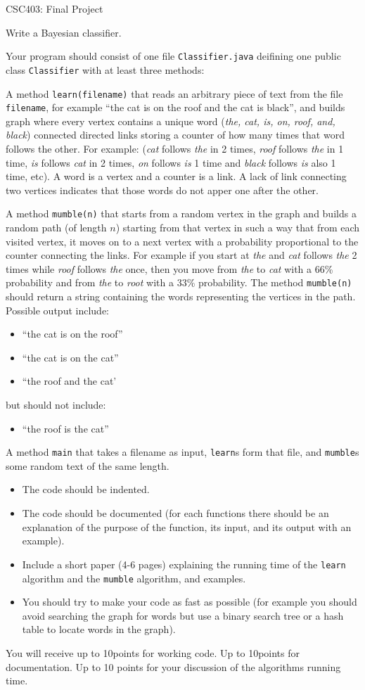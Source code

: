 \documentclass[12pt]{article}
\begin{document}
{\LARGE CSC403: Final Project}

\vskip 1cm

Write a Bayesian classifier. 

Your program should consist of one file {\tt Classifier.java} deifining one public class {\tt Classifier} with at least three methods:

A method {\tt learn(filename)} that reads an arbitrary piece of text from the file {\tt filename}, for example ``the cat is on the roof and the cat is black'', and builds graph where every vertex contains a unique word ({\it the, cat, is, on, roof, and, black}) connected directed links storing a counter of how many times that word follows the other. For example: ({\it cat} follows {\it the} in 2 times, {\it roof} follows {\it the} in 1 time, {\it is} follows {\it cat} in 2 times, {\it on} follows {\it is} 1 time and {\it black} follows {\it is} also 1 time, etc). A word is a vertex and a counter is a link. A lack of link connecting two vertices indicates that those words do not apper one after the other.

A method {\tt mumble(n)} that starts from a random vertex in the graph and builds a random path (of length $n$) starting from that vertex in such a way that from each visited vertex, it moves on to a next vertex with a probability proportional to the counter connecting the links. For example if you start at {\it the} and {\it cat} follows {\it the} 2 times while {\it roof} follows {\it the} once, then you move from {\it the} to {\it cat} with a 66\% probability and from {\it the} to {\it root} with a 33\% probability. The method {\tt mumble(n)} should return a string containing the words representing the vertices in the path. Possible output include:
\begin{itemize}
\item ``the cat is on the roof''
\item ``the cat is on the cat''
\item ``the roof and the cat'
\end{itemize}
but should not include:
\begin{itemize}
\item ``the roof is the cat''
\end{itemize}

A method {\tt main} that takes a filename as input, {\tt learn}s form that file, and {\tt mumble}s some random text of the same length.

\begin{itemize}
\item The code should be indented.
\item The code should be documented (for each functions there should be an explanation of the purpose of the function, its input, and its output with an example).
\item Include a short paper (4-6 pages) explaining the running time of the {\tt learn} algorithm and the {\tt mumble} algorithm, and examples.
\item You should try to make your code as fast as possible (for example you should avoid searching the graph for words but use a binary search tree or a hash table to locate words in the graph).
\end{itemize}

You will receive up to 10points for working code. Up to 10points for documentation. Up to 10 points for your discussion of the algorithms running time.
\end{document}

